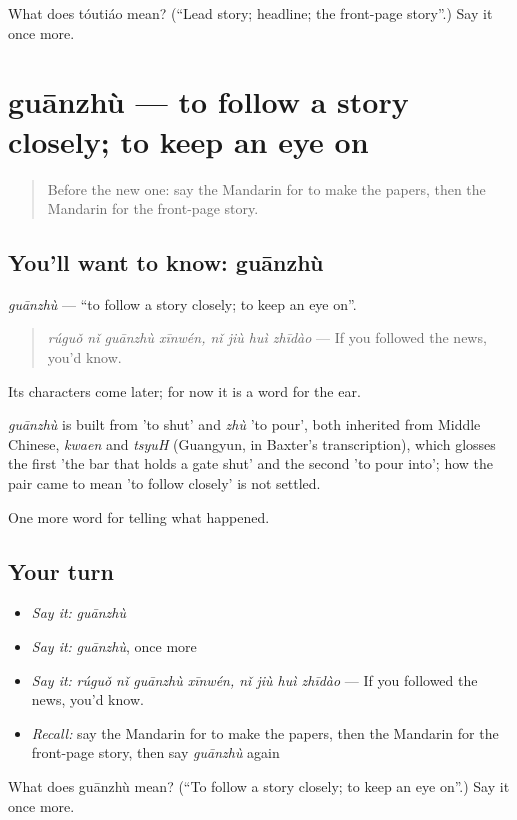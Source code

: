 \begin{tcolorbox}[breakable,colback=teal!4,colframe=teal!35!black,title={Before you move on}]
What does tóutiáo mean? (\textquotedblleft{}Lead story; headline; the front-page story\textquotedblright{}.) Say it once more.
\end{tcolorbox}
\section[guānzhù]{guānzhù — to follow a story closely; to keep an eye on}

\label{lesson:ZH-C293-guanzhu}



\begin{quote}
Before the new one: say the Mandarin for to make the papers, then the Mandarin for the front-page story.
\end{quote}

\subsection*{You'll want to know: guānzhù}
\emph{guānzhù} — \textquotedblleft{}to follow a story closely; to keep an eye on\textquotedblright{}.

\begin{quote}
\emph{rúguǒ nǐ guānzhù xīnwén, nǐ jiù huì zhīdào} — If you followed the news, you'd know.
\end{quote}

Its characters come later; for now it is a word for the ear.

\begin{cousinweb}
\emph{guānzhù} is built from  'to shut' and \emph{zhù} 'to pour', both inherited from Middle Chinese, \emph{kwaen} and \emph{tsyuH} (Guangyun, in Baxter's transcription), which glosses the first 'the bar that holds a gate shut' and the second 'to pour into'; how the pair came to mean 'to follow closely' is not settled.
\end{cousinweb}

\begin{grammarlens}[title={What you've built}]
One more word for telling what happened.
\end{grammarlens}

\subsection*{Your turn}
\begin{itemize}
\raggedright
  \item \emph{Say it:} \emph{guānzhù}
  \item \emph{Say it:} \emph{guānzhù}, once more
  \item \emph{Say it:} \emph{rúguǒ nǐ guānzhù xīnwén, nǐ jiù huì zhīdào} — If you followed the news, you'd know.
  \item \emph{Recall:} say the Mandarin for to make the papers, then the Mandarin for the front-page story, then say \emph{guānzhù} again
\end{itemize}

\begin{tcolorbox}[breakable,colback=teal!4,colframe=teal!35!black,title={Before you move on}]
What does guānzhù mean? (\textquotedblleft{}To follow a story closely; to keep an eye on\textquotedblright{}.) Say it once more.
\end{tcolorbox}
